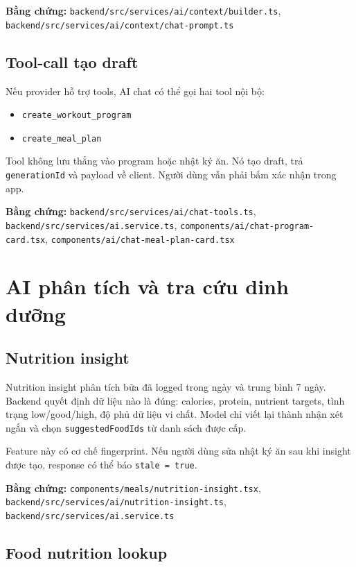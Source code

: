 \documentclass[12pt,a4paper]{article}
\newcommand{\code}[1]{\texttt{#1}}
\newcommand{\evidence}[1]{{\small\nolinkurl{#1}}}
\begin{document}
\textbf{Bằng chứng:} \evidence{backend/src/services/ai/context/builder.ts}, \evidence{backend/src/services/ai/context/chat-prompt.ts}

\subsection{Tool-call tạo draft}

Nếu provider hỗ trợ tools, AI chat có thể gọi hai tool nội bộ:

\begin{itemize}
  \item \code{create\_workout\_program}
  \item \code{create\_meal\_plan}
\end{itemize}

Tool không lưu thẳng vào program hoặc nhật ký ăn. Nó tạo draft, trả \code{generationId} và payload về client. Người dùng vẫn phải bấm xác nhận trong app.

\textbf{Bằng chứng:} \evidence{backend/src/services/ai/chat-tools.ts}, \evidence{backend/src/services/ai.service.ts}, \evidence{components/ai/chat-program-card.tsx}, \evidence{components/ai/chat-meal-plan-card.tsx}

\section{AI phân tích và tra cứu dinh dưỡng}

\subsection{Nutrition insight}

Nutrition insight phân tích bữa đã logged trong ngày và trung bình 7 ngày. Backend quyết định dữ liệu nào là đúng: calories, protein, nutrient targets, tình trạng low/good/high, độ phủ dữ liệu vi chất. Model chỉ viết lại thành nhận xét ngắn và chọn \code{suggestedFoodIds} từ danh sách được cấp.

Feature này có cơ chế fingerprint. Nếu người dùng sửa nhật ký ăn sau khi insight được tạo, response có thể báo \code{stale = true}.

\textbf{Bằng chứng:} \evidence{components/meals/nutrition-insight.tsx}, \evidence{backend/src/services/ai/nutrition-insight.ts}, \evidence{backend/src/services/ai.service.ts}

\subsection{Food nutrition lookup}
\end{document}
